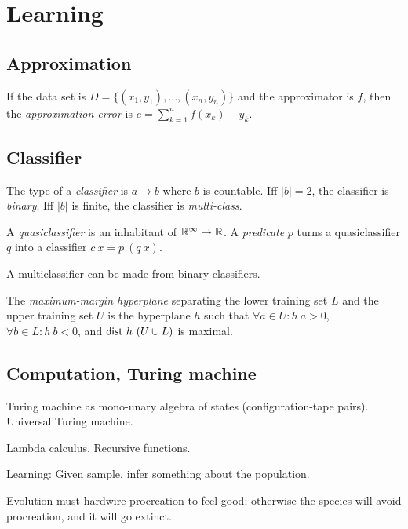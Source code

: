 \chapter{Learning}

\section{Approximation}

If the data set is \(D = \{(x_1,y_1),\ldots,(x_n,y_n)\}\) and the approximator is \(f\),
then the \emph{approximation error} is \(e = \sum_{k=1}^n f(x_k) - y_k\).

\section{Classifier}

%
%
%
The type of a \emph{classifier} is \(a \to b\) where \(b\) is countable.
Iff \(|b| = 2\), the classifier is \emph{binary}.
Iff \(|b|\) is finite, the classifier is \emph{multi-class}.

A \emph{quasiclassifier} is an inhabitant of \(\mathbb{R}^\infty \to \mathbb{R}\).
A \emph{predicate} \(p\) turns a quasiclassifier \(q\) into a classifier \(c~x = p~(q~x)\).

A multiclassifier can be made from binary classifiers.

%
%
The \emph{maximum-margin hyperplane} separating
the lower training set \(L\) and the upper training set \(U\)
is the hyperplane \(h\)
such that
\(\forall a \in U : h~a > 0\),
\,\(\forall b \in L : h~b < 0\),
and \(\textsf{dist}~h~(U \cup L)\) is maximal.

\section{Computation, Turing machine}

Turing machine as mono-unary algebra of states (configuration-tape pairs).
Universal Turing machine.

Lambda calculus.
Recursive functions.

Learning:
Given sample, infer something about the population.

Evolution must hardwire procreation to feel good;
otherwise the species will avoid procreation,
and it will go extinct.

